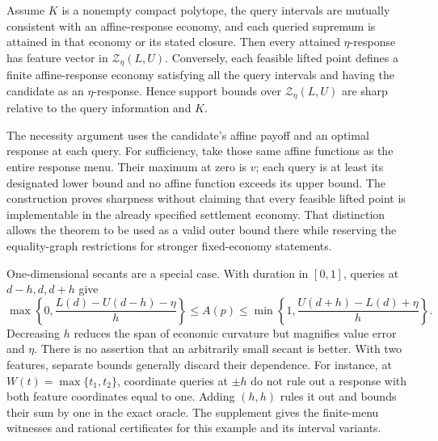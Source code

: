 \begin{theorem}
\label{thm:oracle}
Assume $K$ is a nonempty compact polytope, the query intervals are mutually consistent with an affine-response economy, and each queried supremum is attained in that economy or its stated closure. Then every attained $\eta$-response has feature vector in $\mathcal Z_\eta(L,U)$. Conversely, each feasible lifted point defines a finite affine-response economy satisfying all the query intervals and having the candidate as an $\eta$-response. Hence support bounds over $\mathcal Z_\eta(L,U)$ are sharp relative to the query information and $K$.
\end{theorem}

The necessity argument uses the candidate's affine payoff and an optimal response at each query. For sufficiency, take those same affine functions as the entire response menu. Their maximum at zero is $v$; each query is at least its designated lower bound and no affine function exceeds its upper bound. The construction proves sharpness without claiming that every feasible lifted point is implementable in the already specified settlement economy. That distinction allows the theorem to be used as a valid outer bound there while reserving the equality-graph restrictions for stronger fixed-economy statements.

One-dimensional secants are a special case. With duration in $[0,1]$, queries at $d-h,d,d+h$ give
\begin{equation}
 \max\!\left\{0,\frac{L(d)-U(d-h)-\eta}{h}\right\}
 \leq A(p)\leq
 \min\!\left\{1,\frac{U(d+h)-L(d)+\eta}{h}\right\}.
 \label{eq:secants}
\end{equation}
Decreasing $h$ reduces the span of economic curvature but magnifies value error and $\eta$. There is no assertion that an arbitrarily small secant is better. With two features, separate bounds generally discard their dependence. For instance, at $W(t)=\max\{t_1,t_2\}$, coordinate queries at $\pm h$ do not rule out a response with both feature coordinates equal to one. Adding $(h,h)$ rules it out and bounds their sum by one in the exact oracle. The supplement gives the finite-menu witnesses and rational certificates for this example and its interval variants.

